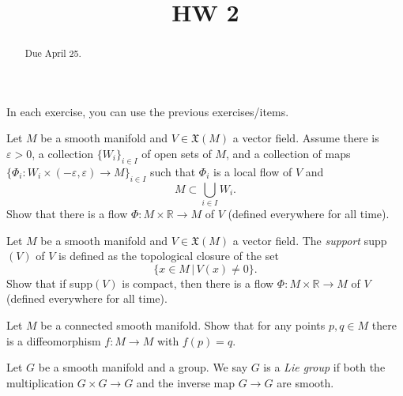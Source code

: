 \documentclass{ximera}
\title{HW 2}
\begin{document}
    \begin{abstract}  Due April 25.  \end{abstract}
    \maketitle

    In each exercise, you can use the previous exercises/items. 

\begin{exercise}
Let $M$ be a smooth manifold and $V \in \mathfrak{X}(M)$ a vector field. Assume there is $\varepsilon > 0$, a collection $\{ W_i \} _{i \in I}$ of open sets of $M$, and a collection of maps $ \{ \Phi_i : W_i \times (-\varepsilon , \varepsilon ) \to M  \} _{i \in I } $ such that $\Phi_i$ is a local flow of $V$ and 
\[      M \subset \bigcup _{i \in I} W_i  .     \]
Show that there is a flow $\Phi : M \times \mathbb{R} \to M$ of $V$ (defined everywhere for all time). 
\end{exercise}


\begin{exercise}
Let $M$ be a smooth manifold and $V \in \mathfrak{X}(M)$ a vector field. The \emph{support} supp$(V)$ of $V$ is defined as the topological closure of the set 
\[    \{ x \in M \, \vert \, V( x) \neq 0 \} .   \]
Show that if supp$(V)$ is compact, then there is a flow $\Phi : M \times \mathbb{R} \to M$ of $V$ (defined everywhere for all time).
\end{exercise}

\begin{exercise}
Let $M$ be a connected smooth manifold. Show that for any points $p , q \in M$ there is a diffeomorphism $f : M \to M$ with $f(p) = q$. 
\end{exercise}

\begin{definition}
Let $G$ be a smooth manifold and a group. We say $G$ is a \emph{Lie group} if both the multiplication $G \times G \to G$ and the inverse map $G \to G$ are smooth.    
\end{definition}
\end{document}
